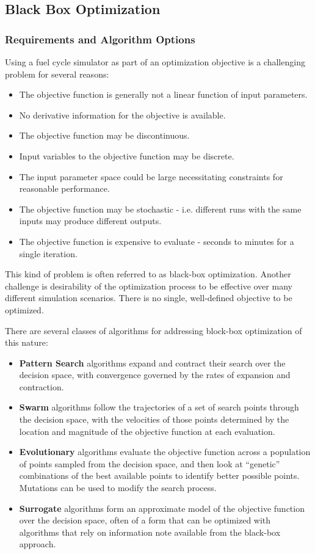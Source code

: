   
\subsection{Black Box Optimization}

\subsubsection{Requirements and Algorithm Options}
Using a fuel cycle simulator as part of an optimization objective is a
challenging problem for several reasons:

\begin{itemize}
\item The objective function is generally not a linear function of input
  parameters.
\item No derivative information for the objective is available.
\item The objective function may be discontinuous.
\item Input variables to the objective function may be discrete.
\item The input parameter space could be large necessitating constraints
  for reasonable performance.
\item The objective function may be stochastic - i.e. different runs with
  the same inputs may produce different outputs.
\item The objective function is expensive to evaluate - seconds to minutes
  for a single iteration.
\end{itemize}

This kind of problem is often referred to as black-box optimization. Another
challenge is desirability of the optimization process to be effective over
many different simulation scenarios. There is no single, well-defined
objective to be optimized.

There are several classes of algorithms for addressing block-box optimization
of this nature:
\begin{itemize}
\item \textbf{Pattern Search} algorithms expand and contract their search over
  the decision space, with convergence governed by the rates of expansion and
  contraction.
\item \textbf{Swarm} algorithms follow the trajectories of a set of search
  points through the decision space, with the velocities of those points
  determined by the location and magnitude of the objective function at each
  evaluation.
\item \textbf{Evolutionary} algorithms evaluate the objective function across
  a population of points sampled from the decision space, and then look at
  ``genetic'' combinations of the best available points to identify better
  possible points.  Mutations can be used to modify the search process.
\item \textbf{Surrogate} algorithms form an approximate model of the objective
  function over the decision space, often of a form that can be optimized with
  algorithms that rely on information note available from the black-box
  approach.
\end{itemize}

